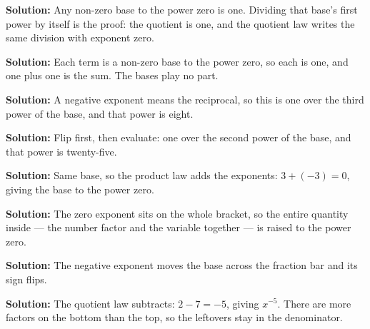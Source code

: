 \documentclass[12pt]{article}
\begin{document}




\textbf{Solution:} \quad Any non-zero base to the power zero is one. Dividing that base's
first power by itself is the proof: the quotient is one, and the quotient law writes the
same division with exponent zero. 


\textbf{Solution:} \quad Each term is a non-zero base to the power zero, so each is one,
and one plus one is the sum. The bases play no part. 


\textbf{Solution:} \quad A negative exponent means the reciprocal, so this is one over the
third power of the base, and that power is eight. 


\textbf{Solution:} \quad Flip first, then evaluate: one over the second power of the base,
and that power is twenty-five. 


\textbf{Solution:} \quad Same base, so the product law adds the exponents: $3 + (-3) = 0$,
giving the base to the power zero. 


\textbf{Solution:} \quad The zero exponent sits on the whole bracket, so the entire
quantity inside --- the number factor and the variable together --- is raised to the power
zero. 


\textbf{Solution:} \quad The negative exponent moves the base across the fraction bar and
its sign flips. 


\textbf{Solution:} \quad The quotient law subtracts: $2 - 7 = -5$, giving $x^{-5}$. There
are more factors on the bottom than the top, so the leftovers stay in the denominator.

\end{document}
